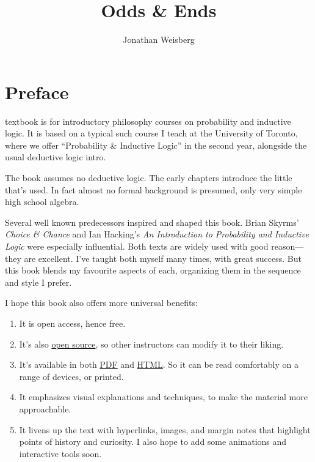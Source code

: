 \documentclass[justified]{tufte-book}
\title{Odds \& Ends}
\author{Jonathan Weisberg}
\date{}
\providecommand{\tightlist}{%
  \setlength{\itemsep}{0pt}\setlength{\parskip}{0pt}}
\theoremstyle{definition}
\theoremstyle{definition}
\theoremstyle{definition}
\theoremstyle{remark}
\begin{document}
\maketitle



{
\setcounter{tocdepth}{1}
\tableofcontents
}

\hypertarget{preface}{%
\chapter*{Preface}\label{preface}}

 textbook is for introductory philosophy courses on
probability and inductive logic. It is based on a typical such course I
teach at the University of Toronto, where we offer ``Probability \&
Inductive Logic'' in the second year, alongside the usual deductive
logic intro.\(\,\)

The book assumes no deductive logic. The early chapters introduce the
little that's used. In fact almost no formal background is presumed,
only very simple high school algebra.

Several well known predecessors inspired and shaped this book. Brian
Skyrms' \emph{Choice \& Chance} and Ian Hacking's \emph{An Introduction
to Probability and Inductive Logic} were especially influential. Both
texts are widely used with good reason---they are excellent. I've taught
both myself many times, with great success. But this book blends my
favourite aspects of each, organizing them in the sequence and style I
prefer.

I hope this book also offers more universal benefits:

\begin{enumerate}
\def\labelenumi{\arabic{enumi}.}
\tightlist
\item
  It is open access, hence free.
\item
  It's also \href{https://github.com/jweisber/vip-source}{open source},
  so other instructors can modify it to their liking.
\item
  It's available in both
  \href{http://jonathanweisberg.org/vip/_main.pdf}{PDF} and
  \href{http://jonathanweisberg.org/vip/}{HTML}. So it can be read
  comfortably on a range of devices, or printed.
\item
  It emphasizes visual explanations and techniques, to make the material
  more approachable.
\item
  It livens up the text with hyperlinks, images, and margin notes that
  highlight points of history and curiosity. I also hope to add some
  animations and interactive tools soon.
\end{enumerate}
\end{document}
